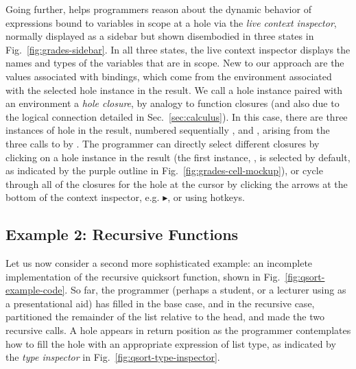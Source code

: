 Going further, \Hazel helps programmers reason about the dynamic behavior of expressions bound to variables in scope at a hole via the \emph{live context inspector}, normally displayed  as a sidebar but shown disembodied in three states in Fig.~\ref{fig:grades-sidebar}. 
In all three states, the live context inspector displays the names and types of the variables that are in scope. 
New to our approach are the values associated with bindings, which come from the environment associated with the selected hole instance in the result. 
We call a hole instance paired with an  environment a \emph{hole closure}, by analogy to function closures (and also due to the logical connection detailed in Sec.~\ref{sec:calculus}). 
In this case, there are three instances of hole  in the result, numbered sequentially ,  and , arising from the three calls to  by . 
The programmer can directly select different closures by clicking on a hole instance in the result (the first instance, , is selected by default, as indicated by the purple outline in Fig.~\ref{fig:grades-cell-mockup}), or cycle through all of the closures for the hole at the cursor by clicking the arrows at the bottom of the context inspector, e.g. $\blacktriangleright$, or using hotkeys.

\vspace{-4px}
\subsection{Example 2: Recursive Functions}\label{sec:qsort1}\label{sec:paths}
\vspace{-2px}



Let us now consider a second more sophisticated example: an incomplete implementation of the recursive quicksort function, shown in Fig.~\ref{fig:qsort-example-code}. So far, the programmer (perhaps a student, or a lecturer using \Hazel as a presentational aid) has filled in the base case, and in the recursive case, partitioned the remainder of the list relative to the head, and made the two recursive calls. A hole appears in return position as the programmer contemplates how to fill the hole with an appropriate expression of list type, as indicated by the \emph{type inspector} in Fig.~\ref{fig:qsort-type-inspector}.

